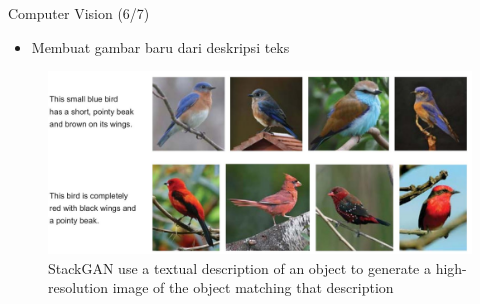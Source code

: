 \documentclass[pdf]{beamer}
\theoremstyle{mystyle}
\begin{document}
\begin{frame}{Computer Vision (6/7)}
	\begin{itemize}
		\item Membuat gambar baru dari deskripsi teks
	\end{itemize}
	\begin{figure}[!ht]
	\centering
	\includegraphics[scale=.225]{images/gans+text+cv.jpg}
	\caption{StackGAN use a textual description of an object to generate a high-resolution image of the object matching that description \citep{elgendy2020deeplearning4vision}}
\end{figure}		
\end{frame}
\end{document}
